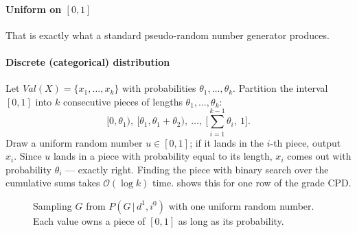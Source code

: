 \documentclass[11pt, oneside]{book}
\newcommand{\Prob}{\mathbb{P}}           %
\newcommand{\bigO}[1]{\mathcal{O}\!\left(#1\right)}
\newcommand{\given}{\,\vert\,}           %
\newcommand{\Val}{\mathit{Val}}          %
\begin{document}
\paragraph{Uniform on $[0, 1]$} That is exactly what a standard
pseudo-random number generator produces.

\paragraph{Discrete (categorical) distribution} Let $\Val(X) = \{x_1,
\ldots, x_k\}$ with probabilities $\theta_1, \ldots, \theta_k$. Partition the
interval $[0, 1]$ into $k$ consecutive pieces of lengths $\theta_1, \ldots,
\theta_k$:
\[
[0, \theta_1),\ [\theta_1, \theta_1 + \theta_2),\ \ldots,\
\Big[\textstyle\sum_{i=1}^{k-1} \theta_i,\ 1\Big].
\]
Draw a uniform random number $u \in [0, 1]$; if it lands in the $i$-th piece,
output $x_i$. Since $u$ lands in a piece with probability equal to its
length, $x_i$ comes out with probability $\theta_i$ --- exactly right.
Finding the piece with binary search over the cumulative sums takes
$\bigO{\log k}$ time. \Cref{fig:interval-sampling} shows this for one row of
the grade CPD.

\begin{figure}[htbp]
\centering
{}
\caption{Sampling $G$ from $P(G \given d^1, i^0)$ with one uniform random
number. Each value owns a piece of $[0, 1]$ as long as its probability.}
\label{fig:interval-sampling}
\end{figure}
\end{document}
